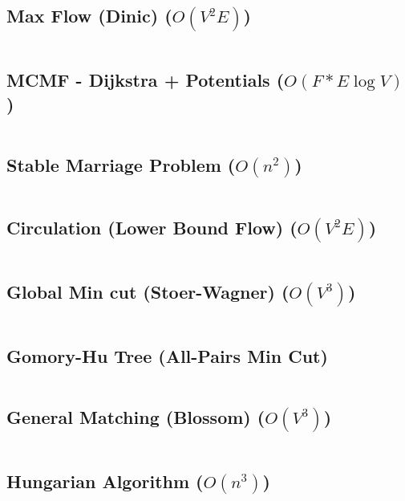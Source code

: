 \documentclass[8pt, a4paper, oneside]{extarticle}
\begin{document}
\begin{multicols*}{2}
\subsection{Max Flow (Dinic) ($O(V^2 E)$)}
\inputminted{c++}{codes/flow_matching/dinic.cpp}


\subsection{MCMF - Dijkstra + Potentials ($O(F * E \log V)$)}
\inputminted{c++}{codes/flow_matching/mcmf_johnson.cpp}

\subsection{Stable Marriage Problem ($O(n^2)$)}
\inputminted{c++}{codes/flow_matching/stable_marriage.cpp}

\subsection{Circulation (Lower Bound Flow) ($O(V^2 E)$)}
\inputminted{c++}{codes/flow_matching/circulation.cpp}

\subsection{Global Min cut (Stoer-Wagner) ($O(V^3)$)}
\inputminted{c++}{codes/flow_matching/stoer_wagner.cpp}

\subsection{Gomory-Hu Tree (All-Pairs Min Cut)}
\inputminted{c++}{codes/flow_matching/gomory_hu.cpp}

\subsection{General Matching (Blossom) ($O(V^3)$)}
\inputminted{c++}{codes/flow_matching/general_matching.cpp}

\subsection{Hungarian Algorithm ($O(n^3)$)}
\inputminted{c++}{codes/flow_matching/hungarian.cpp}


\end{multicols*}
\end{document}
